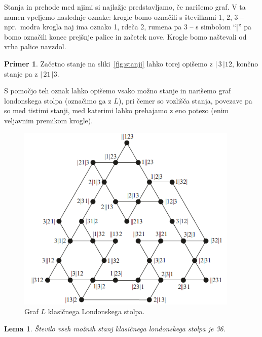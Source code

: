 \documentclass[12pt,a4paper]{amsart}
\theoremstyle{definition} %
\newtheorem{primer}[definicija]{Primer}
\theoremstyle{plain} %
\newtheorem{lema}[definicija]{Lema}
\newcommand{\bd}{\ensuremath{|\,}}
\newcommand{\ed}{\ensuremath{\,|}}
\begin{document}
Stanja in prehode med njimi si najlažje predstavljamo, če narišemo graf. V ta namen vpeljemo naslednje oznake:
krogle bomo označili s številkami 1, 2, 3 -- npr.\ modra krogla naj ima oznako 1, rdeča 2, rumena pa 3 -- s simbolom ``|'' pa bomo označili konec prejšnje palice in začetek nove. Krogle bomo naštevali od vrha palice navzdol.

\begin{primer}
    Začetno stanje na sliki~\ref{fig:stanji} lahko torej opišemo z $\bd 3 \ed 12$, končno stanje pa z $\bd 21 \ed 3$.
\end{primer}

S pomočjo teh oznak lahko opišemo vsako možno stanje in narišemo graf londonskega stolpa (označimo ga z $L$), pri čemer so vozlišča stanja, povezave pa so med tistimi stanji, med katerimi lahko prehajamo z eno potezo (enim veljavnim premikom krogle).

\begin{figure}[h!]
    \includegraphics[width=300pt]{img/tolgraph.png}
    \caption{Graf $L$ klasičnega Londonskega stolpa.}
    \label{fig:tolgraph}
\end{figure}

\begin{lema}
    \label{lem:stanja-klas-lond}
    Število vseh možnih stanj klasičnega londonskega stolpa je 36.
\end{lema}
\end{document}
